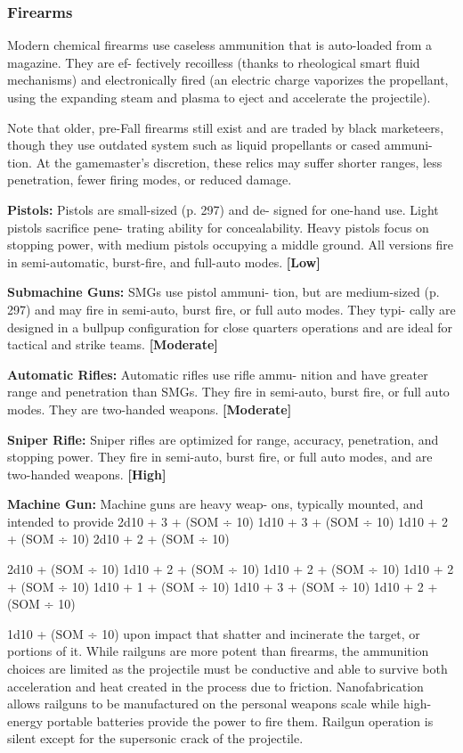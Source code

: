 \subsubsection{Firearms}

Modern chemical firearms use caseless ammunition 
that is auto-loaded from a magazine. They are ef-
fectively recoilless (thanks to rheological smart fluid 
mechanisms) and electronically fired (an electric 
charge vaporizes the propellant, using the expanding 
steam and plasma to eject and accelerate the projectile).

Note that older, pre-Fall firearms still exist and are 
traded by black marketeers, though they use outdated 
system such as liquid propellants or cased ammuni-
tion. At the gamemaster's discretion, these relics may 
suffer shorter ranges, less penetration, fewer firing 
modes, or reduced damage.

\textbf{Pistols:} Pistols are small-sized (p. 297) and de-
signed for one-hand use. Light pistols sacrifice pene-
trating ability for concealability. Heavy pistols focus 
on stopping power, with medium pistols occupying 
a middle ground. All versions fire in semi-automatic, 
burst-fire, and full-auto modes. \textbf{[Low]}

\textbf{Submachine Guns:} SMGs use pistol ammuni-
tion, but are medium-sized (p. 297) and may fire in 
semi-auto, burst fire, or full auto modes. They typi-
cally are designed in a bullpup configuration for 
close quarters operations and are ideal for tactical 
and strike teams. \textbf{[Moderate]}

\textbf{Automatic Rifles:} Automatic rifles use rifle ammu-
nition and have greater range and penetration than 
SMGs. They fire in semi-auto, burst fire, or full auto 
modes. They are two-handed weapons. \textbf{[Moderate]}

\textbf{Sniper Rifle:} Sniper rifles are optimized for range, 
accuracy, penetration, and stopping power. They fire 
in semi-auto, burst fire, or full auto modes, and are 
two-handed weapons. \textbf{[High]}

\textbf{Machine Gun:} Machine guns are heavy weap-
ons, typically mounted, and intended to provide 
2d10 + 3 + (SOM ÷ 10) 
1d10 + 3 + (SOM ÷ 10) 
1d10 + 2 + (SOM ÷ 10) 
2d10 + 2 + (SOM ÷ 10)

2d10 + (SOM ÷ 10) 
1d10 + 2 + (SOM ÷ 10) 
1d10 + 2 + (SOM ÷ 10) 
1d10 + 2 + (SOM ÷ 10) 
1d10 + 1 + (SOM ÷ 10) 
1d10 + 3 + (SOM ÷ 10) 
1d10 + 2 + (SOM ÷ 10) 

1d10 + (SOM ÷ 10)
upon impact that shatter and incinerate the target, or 
portions of it. While railguns are more potent than 
firearms, the ammunition choices are limited as the 
projectile must be conductive and able to survive 
both acceleration and heat created in the process due 
to friction. Nanofabrication allows railguns to be 
manufactured on the personal weapons scale while 
high-energy portable batteries provide the power to 
fire them. Railgun operation is silent except for the 
supersonic crack of the projectile.


